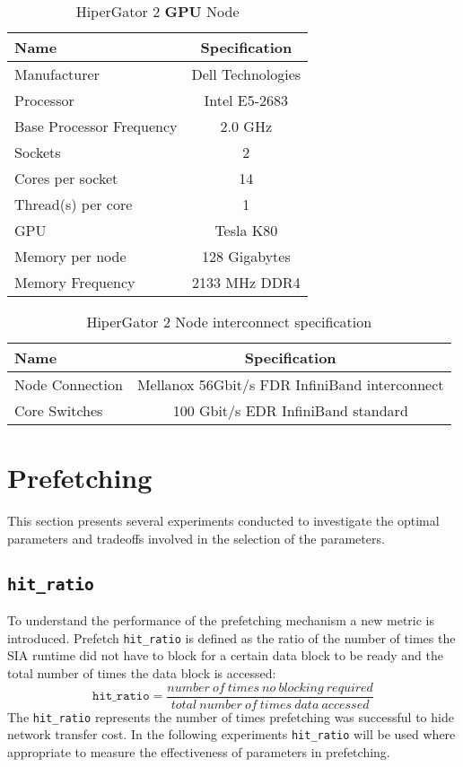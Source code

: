 \begin{table}[h]
  \centering
  \begin{tabular}{l | c}
    \hline
    Name                       & Specification     \\
    \hline
    Manufacturer               & Dell Technologies \\
    Processor                  & Intel E5-2683     \\
    Base Processor Frequency   & 2.0 GHz           \\
    Sockets                    & 2                 \\
    Cores per socket           & 14                \\
    Thread(s) per core         & 1                 \\
    GPU                        & Tesla K80         \\
    Memory per node            & 128 Gigabytes     \\
    Memory Frequency           & 2133 MHz DDR4     \\
    \hline
  \end{tabular}
  \caption{HiperGator 2 \textbf{GPU} Node}
  \label{tab:hpggpuspecs}
\end{table}

\begin{table}[h]
  \centering
  \begin{tabular}{l | c}
    \hline
    Name             & Specification                                 \\
    \hline
    Node Connection  & Mellanox 56Gbit/s FDR InfiniBand interconnect \\
    Core Switches    & 100 Gbit/s EDR InfiniBand standard            \\
    \hline
  \end{tabular}
  \caption{HiperGator 2 Node interconnect specification}
  \label{tab:hpgconnectspecs}
\end{table}

\section{Prefetching}
This section presents several experiments conducted to investigate the optimal
parameters and tradeoffs involved in the selection of the parameters.

\subsection{\texttt{hit\_ratio}}\label{sec:hit_ratio}
To understand the performance of the prefetching mechanism a new metric is introduced.
Prefetch \texttt{hit\_ratio} is defined as the ratio of the number of times the
SIA runtime did not have to block for a certain data block to be ready and the total
number of times the data block is accessed:
\[
  \texttt{hit\_ratio} = \frac{number~of~times~no~blocking~required}{total~number~of~times~data~accessed}
\]
The \texttt{hit\_ratio} represents the number of times prefetching was successful
to hide network transfer cost. In the following experiments \texttt{hit\_ratio}
will be used where appropriate to measure the effectiveness of parameters in prefetching.

